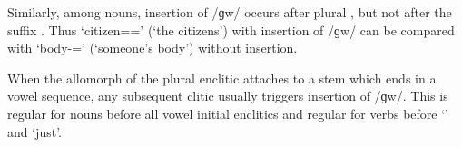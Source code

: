 Similarly, among nouns, insertion of /ɡw/ occurs after plural ,
but not after the  suffix .
Thus  `citizen={\ein}={\ee}' (`the citizens')
with insertion of /ɡw/ can be compared
with  `body-{\N}={\ee}' (`someone's body') without insertion.

When the  allomorph of the plural enclitic
attaches to a stem which ends in a vowel sequence,
any subsequent clitic usually triggers insertion of /ɡw/.
This is regular for nouns before all vowel initial
enclitics and regular for verbs before  `{\een}'
and  `just'.
